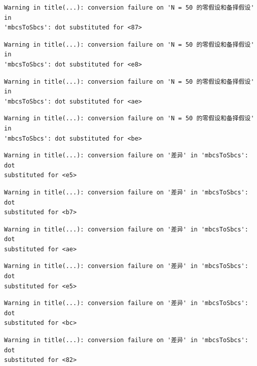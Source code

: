 \documentclass[
  letterpaper,
  DIV=11,
  numbers=noendperiod]{scrreprt}
\begin{document}
\begin{verbatim}
Warning in title(...): conversion failure on 'N = 50 的零假设和备择假设' in
'mbcsToSbcs': dot substituted for <87>
\end{verbatim}

\begin{verbatim}
Warning in title(...): conversion failure on 'N = 50 的零假设和备择假设' in
'mbcsToSbcs': dot substituted for <e8>
\end{verbatim}

\begin{verbatim}
Warning in title(...): conversion failure on 'N = 50 的零假设和备择假设' in
'mbcsToSbcs': dot substituted for <ae>
\end{verbatim}

\begin{verbatim}
Warning in title(...): conversion failure on 'N = 50 的零假设和备择假设' in
'mbcsToSbcs': dot substituted for <be>
\end{verbatim}

\begin{verbatim}
Warning in title(...): conversion failure on '差异' in 'mbcsToSbcs': dot
substituted for <e5>
\end{verbatim}

\begin{verbatim}
Warning in title(...): conversion failure on '差异' in 'mbcsToSbcs': dot
substituted for <b7>
\end{verbatim}

\begin{verbatim}
Warning in title(...): conversion failure on '差异' in 'mbcsToSbcs': dot
substituted for <ae>
\end{verbatim}

\begin{verbatim}
Warning in title(...): conversion failure on '差异' in 'mbcsToSbcs': dot
substituted for <e5>
\end{verbatim}

\begin{verbatim}
Warning in title(...): conversion failure on '差异' in 'mbcsToSbcs': dot
substituted for <bc>
\end{verbatim}

\begin{verbatim}
Warning in title(...): conversion failure on '差异' in 'mbcsToSbcs': dot
substituted for <82>
\end{verbatim}
\end{document}
